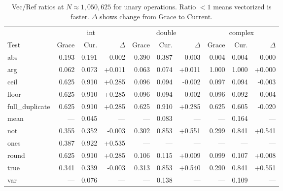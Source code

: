\begin{table}[H]
\centering
\caption{Vec/Ref ratios at $N \approx 1{,}050{,}625$ for unary operations. Ratio $< 1$ means vectorized is faster. $\Delta$ shows change from Grace to Current.}
\label{tab:ratio-unary}
\small
\begin{tabular}{l | r r r | r r r | r r r}
\toprule
 & \multicolumn{3}{c|}{int} & \multicolumn{3}{c|}{double} & \multicolumn{3}{c}{complex} \\
Test & Grace & Cur. & $\Delta$ & Grace & Cur. & $\Delta$ & Grace & Cur. & $\Delta$ \\
\midrule
  abs & 0.193 & 0.191 & -0.002 & 0.390 & 0.387 & -0.003 & 0.004 & 0.004 & -0.000 \\
  arg & 0.062 & 0.073 & +0.011 & 0.063 & 0.074 & +0.011 & 1.000 & 1.000 & +0.000 \\
  ceil & 0.625 & 0.910 & +0.285 & 0.096 & 0.094 & -0.002 & 0.097 & 0.094 & -0.003 \\
  floor & 0.625 & 0.910 & +0.285 & 0.096 & 0.094 & -0.002 & 0.096 & 0.092 & -0.004 \\
  full\_duplicate & 0.625 & 0.910 & +0.285 & 0.625 & 0.910 & +0.285 & 0.625 & 0.605 & -0.020 \\
  mean & --- & 0.045 & --- & --- & 0.083 & --- & --- & 0.164 & --- \\
  not & 0.355 & 0.352 & -0.003 & 0.302 & 0.853 & +0.551 & 0.299 & 0.841 & +0.541 \\
  ones & 0.387 & 0.922 & +0.535 & --- & --- & --- & --- & --- & --- \\
  round & 0.625 & 0.910 & +0.285 & 0.106 & 0.115 & +0.009 & 0.099 & 0.107 & +0.008 \\
  true & 0.341 & 0.339 & -0.003 & 0.313 & 0.853 & +0.540 & 0.290 & 0.841 & +0.551 \\
  var & --- & 0.076 & --- & --- & 0.138 & --- & --- & 0.109 & --- \\
\bottomrule
\end{tabular}
\end{table}
